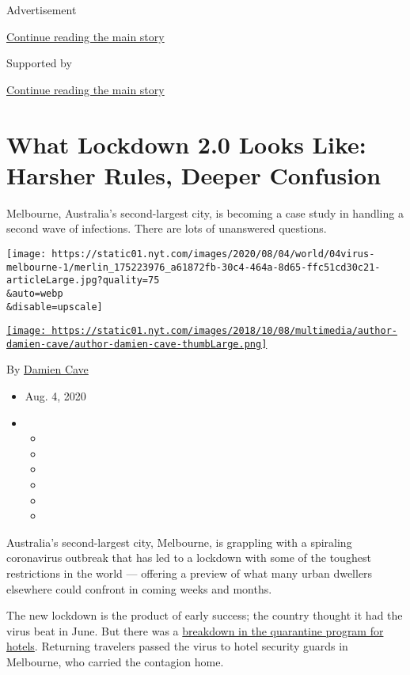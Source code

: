 Advertisement

\protect\hyperlink{after-top}{Continue reading the main story}

Supported by

\protect\hyperlink{after-sponsor}{Continue reading the main story}

\hypertarget{what-lockdown-20-looks-like-harsher-rules-deeper-confusion}{%
\section{What Lockdown 2.0 Looks Like: Harsher Rules, Deeper
Confusion}\label{what-lockdown-20-looks-like-harsher-rules-deeper-confusion}}

Melbourne, Australia's second-largest city, is becoming a case study in
handling a second wave of infections. There are lots of unanswered
questions.

\texttt{[image: https://static01.nyt.com/images/2020/08/04/world/04virus-melbourne-1/merlin\_175223976\_a61872fb-30c4-464a-8d65-ffc51cd30c21-articleLarge.jpg?quality=75\\\&auto=webp\\\&disable=upscale]}

\href{https://www.nytimes.com/by/damien-cave}{\texttt{[image: https://static01.nyt.com/images/2018/10/08/multimedia/author-damien-cave/author-damien-cave-thumbLarge.png]}}

By \href{https://www.nytimes.com/by/damien-cave}{Damien Cave}

\begin{itemize}
\item
  Aug. 4, 2020
\item
  \begin{itemize}
  \item
  \item
  \item
  \item
  \item
  \item
  \end{itemize}
\end{itemize}

Australia's second-largest city, Melbourne, is grappling with a
spiraling coronavirus outbreak that has led to a lockdown with some of
the toughest restrictions in the world --- offering a preview of what
many urban dwellers elsewhere could confront in coming weeks and months.

The new lockdown is the product of early success; the country thought it
had the virus beat in June. But there was a
\href{https://www.theage.com.au/national/victoria/how-hotel-quarantine-let-covid-19-out-of-the-bag-in-victoria-20200703-p558og.html}{breakdown
in the quarantine program for hotels}. Returning travelers passed the
virus to hotel security guards in Melbourne, who carried the contagion
home.

